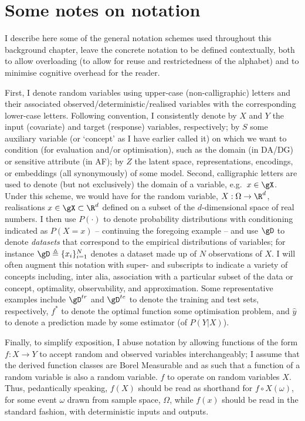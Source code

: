 \section{Some notes on notation}\label{sec:notation}
I describe here some of the general notation schemes used throughout this background chapter,
leave the concrete notation to be defined contextually, both to allow overloading (to allow for
reuse and restrictedness of the alphabet) and to minimise cognitive overhead for the reader.

%
First, I denote random variables using upper-case (non-calligraphic) letters and their associated
observed/deterministic/realised variables with the corresponding lower-case letters.
%
Following convention, I consistently denote by \(X\) and \(Y\) the input (covariate) and target
(response) variables, respectively; by \(S\) some auxiliary variable (or `concept' as I have
earlier called it) on which we want to condition (for evaluation and/or optimisation), such as the
domain (in \ac{DA}/\ac{DG}) or sensitive attribute (in \ac{AF}); by \(Z\) the latent space,
representations, encodings, or embeddings (all synonymously) of some model.
%
Second, calligraphic letters are used to denote (but not exclusively) the domain of a variable,
e.g.\ \(x \in \gX \).
%
Under this scheme, we would have for the random variable, \(X: \Omega \to \R^d \), realisations \(x
\in \gX \subset \R^d \) defined on a subset of the \(d\)-dimensional space of real numbers.
%
I then use \(P(\cdot)\) to denote probability distributions with conditioning indicated as
\(P(X=x)\) -- continuing the foregoing example -- and use \(\gD\) to denote \emph{datasets} that
correspond to the empirical distributions of variables; for instance \(\gD \triangleq
\{x_i\}_{i=1}^N \) denotes a dataset made up of \(N\) observations of \(X\).
%
I will often augment this notation with super- and subscripts to indicate a variety of concepts
including, inter alia, association with a particular subset of the data or concept, optimality,
observability, and approximation.
%
Some representative examples include \(\gD^{tr}\) and \(\gD^{te}\) to denote the training and test
sets, respectively, \(f^\ast\) to denote the optimal function \wrt{} some optimisation problem, and
\(\hat{y}\) to denote a prediction made by some estimator (of \(P(Y|X)\)).
%

%
Finally, to simplify exposition, I abuse notation by allowing functions of the form \(f: X \to Y
\) to accept random and observed variables interchangeably; I assume that the derived function
classes are Borel Measurable and as such that a function of a random variable is also a random
variable. \(f\) to operate on random variables \(X\).
Thus, pedantically speaking, \( f(X) \) should be read as shorthand for \( f \circ X(\omega) \),
for some event \( \omega \) drawn from sample space, \( \Omega \), while \( f(x) \) should be read
in the standard fashion, with deterministic inputs and outputs.
